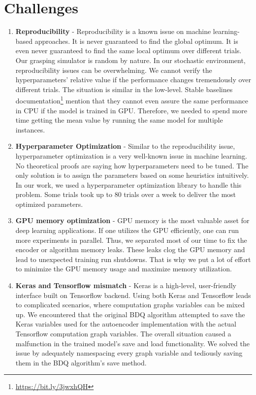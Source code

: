 \section{Challenges}
    \begin{enumerate}
        \item \textbf{Reproducibility} -   Reproducibility is a known issue on machine learning-based approaches. It is never guaranteed to find the global optimum. It is even never guaranteed to find the same local optimum over different trials. Our grasping simulator is random by nature. In our stochastic environment, reproducibility issues can be overwhelming. We cannot verify the hyperparameters’ relative value if the performance changes tremendously over different trials. The situation is similar in the low-level. Stable baselines documentation\footnote{\url{https://bit.ly/3jwxhQH}} 
        mention that they cannot even assure the same performance in CPU if the model is trained in GPU. Therefore, we needed to spend more time getting the mean value by running the same model for multiple instances.
        \item \textbf{Hyperparameter Optimization} - Similar to the reproducibility issue, hyperparameter optimization is a very well-known issue in machine learning. No theoretical proofs are saying how hyperparameters need to be tuned. The  only solution is to assign the parameters based on some heuristics intuitively. In our work, we used a hyperparameter optimization library to handle this problem. Some trials took up to 80 trials over a week to deliver the most optimized parameters.
        \item \textbf{GPU memory optimization} - GPU memory is the most valuable asset for deep learning applications. If one utilizes the GPU efficiently, one can run more experiments in parallel. Thus, we separated most of our time to fix the encoder or algorithm memory leaks. These leaks clog the GPU memory and lead to unexpected training run shutdowns. That is why we put a lot of effort to minimize the GPU memory usage and maximize memory utilization.
        \item \textbf{Keras and Tensorflow mismatch} - Keras is a high-level, user-friendly interface built on Tensorflow backend. Using both Keras and Tensorflow leads to complicated scenarios, where computation graphs variables can be mixed up. We encountered that the original BDQ algorithm attempted to save the Keras variables used for the autoencoder implementation with the actual Tensorflow computation graph variables. The overall situation caused a malfunction in the trained model’s save and load functionality. We solved the issue by adequately namespacing every graph variable and tediously saving them in the BDQ algorithm’s save method.
    \end{enumerate}
  
    